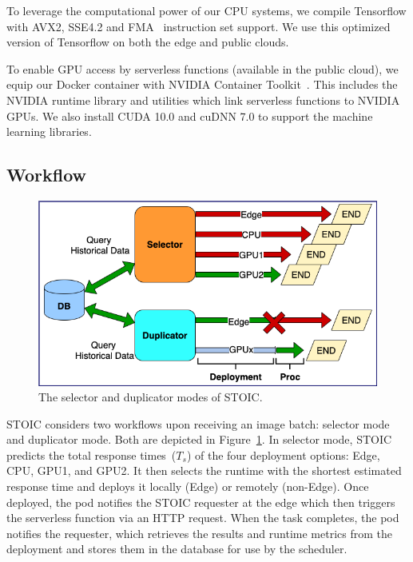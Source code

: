 To leverage the computational power of our CPU systems,
we compile Tensorflow with AVX2, SSE4.2 \cite{ref:avx} and
FMA~\cite{ref:fma} instruction set support. We use this optimized version
of Tensorflow on both the edge and public clouds.
 
To enable GPU access by serverless functions (available in the public cloud), 
we equip our Docker container with NVIDIA
Container Toolkit~\cite{ref:nvidia}. This includes the NVIDIA runtime library
and utilities which link serverless functions to NVIDIA GPUs. We also install
CUDA 10.0 and cuDNN 7.0 to support the machine learning libraries.
 
 
 \subsection{Workflow}

\begin{figure}[t] \centering 
\includegraphics[scale=0.33]{figures/selector_duplicator.png}
\caption{The selector and duplicator modes of STOIC. 
\label{fig:duplicator}}
\end{figure}


STOIC considers two workflows upon receiving an image batch: 
selector mode and duplicator mode.
Both are depicted in Figure~\ref{fig:duplicator}.
In selector mode, STOIC
predicts the total response times~($T_s$) of the four deployment options: Edge, CPU, GPU1, and GPU2.  It then selects the runtime with
the shortest estimated response time and deploys it locally (Edge) or remotely (non-Edge).
Once deployed, the pod notifies the STOIC requester at the edge which then
triggers the serverless function via an HTTP request.
When the task completes, the pod notifies the requester, which
retrieves the results and runtime metrics from the deployment and stores
them in the database for use by the scheduler.

